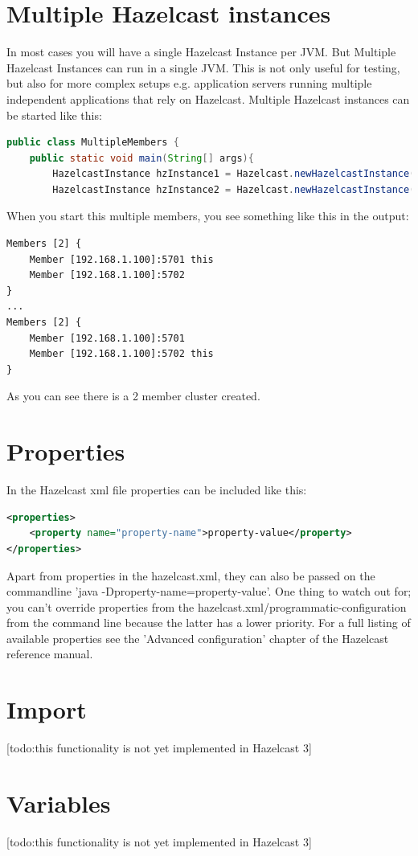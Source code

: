 \section{Multiple Hazelcast instances}
In most cases you will have a single Hazelcast Instance per JVM. But Multiple Hazelcast Instances can run in a single JVM. This is not only useful for testing, but also for more complex setups e.g. application servers running multiple independent applications that rely on Hazelcast. Multiple Hazelcast instances can be started like this:
\begin{lstlisting}[language=java]
public class MultipleMembers {
    public static void main(String[] args){
        HazelcastInstance hzInstance1 = Hazelcast.newHazelcastInstance();
        HazelcastInstance hzInstance2 = Hazelcast.newHazelcastInstance();}}
\end{lstlisting}
When you start this multiple members, you see something like this in the output:
\begin{lstlisting}
Members [2] {
    Member [192.168.1.100]:5701 this
    Member [192.168.1.100]:5702
}
...
Members [2] {
    Member [192.168.1.100]:5701
    Member [192.168.1.100]:5702 this
}
\end{lstlisting}
As you can see there is a 2 member cluster created.

\section{Properties}
In the Hazelcast xml file properties can be included like this:
\begin{lstlisting}[language=xml]
<properties>
    <property name="property-name">property-value</property>
</properties>
\end{lstlisting}
 Apart from properties in the hazelcast.xml, they can also be passed on the commandline 'java -Dproperty-name=property-value'. One thing to watch out for; you can't override properties from the hazelcast.xml/programmatic-configuration from the command line because the latter has a lower priority. For a full listing of available properties see the 'Advanced configuration' chapter of the Hazelcast reference manual.

\section{Import}
[todo:this functionality is not yet implemented in Hazelcast 3]

\section{Variables}
[todo:this functionality is not yet implemented in Hazelcast 3]

